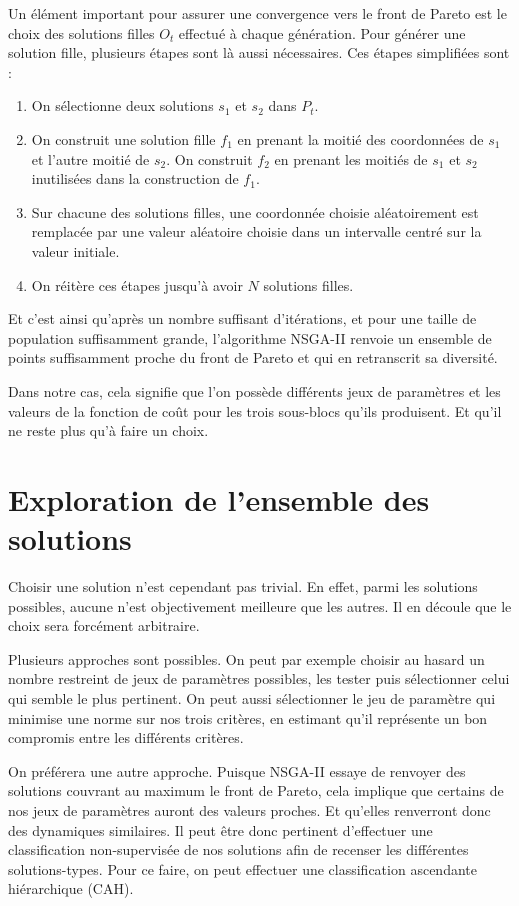Un élément important pour assurer une convergence vers le front de Pareto est le choix des solutions filles $O_t$ effectué à chaque génération.
Pour générer une solution fille, plusieurs étapes sont là aussi nécessaires.
Ces étapes simplifiées sont :
\begin{enumerate}
 \item On sélectionne deux solutions $s_1$ et $s_2$ dans $P_t$.
 \item On construit une solution fille $f_1$ en prenant la moitié des coordonnées de $s_1$ et l'autre moitié de $s_2$. 
 On construit $f_2$ en prenant les moitiés de $s_1$ et $s_2$ inutilisées dans la construction de $f_1$.
 \item Sur chacune des solutions filles, une coordonnée choisie aléatoirement est remplacée par une valeur aléatoire choisie dans un intervalle centré sur la valeur initiale.
 \item On réitère ces étapes jusqu'à avoir $N$ solutions filles.
\end{enumerate}


Et c'est ainsi qu'après un nombre suffisant d'itérations, et pour une taille de population suffisamment grande, l'algorithme NSGA-II renvoie un ensemble de points suffisamment proche du front de Pareto et qui en retranscrit sa diversité.


Dans notre cas, cela signifie que l'on possède différents jeux de paramètres et les valeurs de la fonction de coût pour les trois sous-blocs qu'ils produisent.
Et qu'il ne reste plus qu'à faire un choix.



\section{Exploration de l'ensemble des solutions}


Choisir une solution n'est cependant pas trivial.
En effet, parmi les solutions possibles, aucune n'est objectivement meilleure que les autres.
Il en découle que le choix sera forcément arbitraire.

Plusieurs approches sont possibles.
On peut par exemple choisir au hasard un nombre restreint de jeux de paramètres possibles, les tester puis sélectionner celui qui semble le plus pertinent.
On peut aussi sélectionner le jeu de paramètre qui minimise une norme sur nos trois critères, en estimant qu'il représente un bon compromis entre les différents critères.

On préférera une autre approche. 
Puisque NSGA-II essaye de renvoyer des solutions couvrant au maximum le front de Pareto, cela implique que certains de nos jeux de paramètres auront des valeurs proches.
Et qu'elles renverront donc des dynamiques similaires.
Il peut être donc pertinent d'effectuer une classification non-supervisée de nos solutions afin de recenser les différentes solutions-types.
Pour ce faire, on peut effectuer une classification ascendante hiérarchique (CAH).

